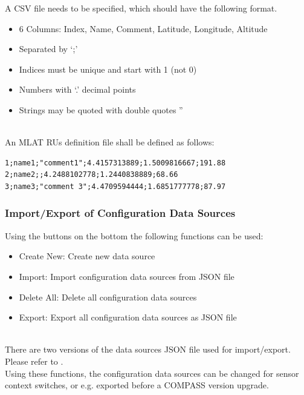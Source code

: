 A CSV file needs to be specified, which should have the following format.
\begin{itemize}
\item 6 Columns: Index, Name, Comment, Latitude, Longitude, Altitude
\item Separated by ‘;’
\item Indices must be unique and start with 1 (not 0)
\item Numbers with ‘.’ decimal points
\item Strings may be quoted with double quotes ”
\end{itemize}
\ \\

An MLAT RUs definition file shall be defined as follows:
\begin{lstlisting}
1;name1;"comment1";4.4157313889;1.5009816667;191.88
2;name2;;4.2488102778;1.2440838889;68.66
3;name3;"comment 3";4.4709594444;1.6851777778;87.97
\end{lstlisting}

\subsubsection{Import/Export of Configuration Data Sources}
\label{sec:config_ds_export}

Using the buttons on the bottom the following functions can be used:

\begin{itemize}
\item Create New: Create new data source
\item Import: Import configuration data sources from JSON file
\item Delete All: Delete all configuration data sources
\item Export: Export all configuration data sources as JSON file
\end{itemize}
\ \\

There are two versions of the data sources JSON file used for import/export. Please refer to . \\

Using these functions, the configuration data sources can be changed for sensor context switches, or e.g. exported before a COMPASS version upgrade.
